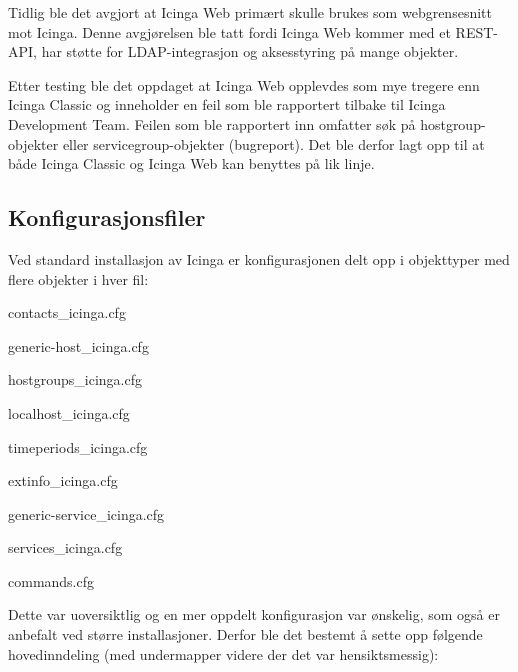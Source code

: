 Tidlig ble det avgjort at Icinga Web primært skulle brukes som webgrensesnitt mot Icinga. Denne avgjørelsen ble tatt fordi Icinga Web kommer med et REST-API, har støtte for LDAP-integrasjon og aksesstyring på mange objekter.

Etter testing ble det oppdaget at Icinga Web opplevdes som mye tregere enn Icinga Classic og inneholder en feil som ble rapportert tilbake til Icinga Development Team. Feilen som ble rapportert inn omfatter søk på hostgroup-objekter eller servicegroup-objekter (bugreport\cite{icingawebbug}). Det ble derfor lagt opp til at både Icinga Classic og Icinga Web kan benyttes på lik linje.
\subsection{Konfigurasjonsfiler}
Ved standard installasjon av Icinga er konfigurasjonen delt opp i objekttyper med flere objekter i hver fil:
\begin{itemize*}
\item contacts\_icinga.cfg  
\item generic-host\_icinga.cfg     
\item hostgroups\_icinga.cfg  
\item localhost\_icinga.cfg  
\item timeperiods\_icinga.cfg
\item extinfo\_icinga.cfg   
\item generic-service\_icinga.cfg   
\item services\_icinga.cfg
\item commands.cfg
\end{itemize*}
Dette var uoversiktlig og en mer oppdelt konfigurasjon var ønskelig, som også er anbefalt ved større installasjoner\cite{nagiosenterprise,sysadmin}. Derfor ble det bestemt å sette opp følgende hovedinndeling (med undermapper videre der det var hensiktsmessig):

\makeatletter
\newcount\dirtree@lvl
\newcount\dirtree@plvl
\newcount\dirtree@clvl
\def\dirtree@growth{%
  \ifnum\tikznumberofcurrentchild=1\relax
  \global\advance\dirtree@plvl by 1
  \expandafter\xdef\csname dirtree@p@\the\dirtree@plvl\endcsname{\the\dirtree@lvl}
  \fi
  \global\advance\dirtree@lvl by 1\relax
  \dirtree@clvl=\dirtree@lvl
  \advance\dirtree@clvl by -\csname dirtree@p@\the\dirtree@plvl\endcsname
  \pgf@xa=0.5cm\relax
  \pgf@ya=-0.5cm\relax
  \pgf@ya=\dirtree@clvl\pgf@ya
  \pgftransformshift{\pgfqpoint{\the\pgf@xa}{\the\pgf@ya}}%
  \ifnum\tikznumberofcurrentchild=\tikznumberofchildren
  \global\advance\dirtree@plvl by -1
  \fi
}

